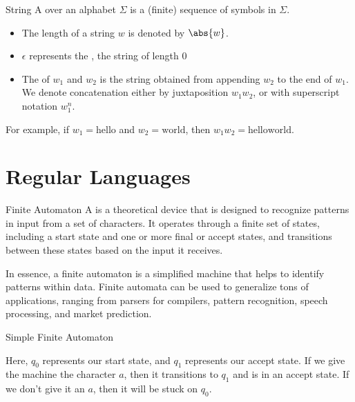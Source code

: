\documentclass[math]{amznotes}
\begin{document}
\begin{dfnbox}{String}{}
    A  over an alphabet $\Sigma$ is a (finite) sequence of symbols in $\Sigma$.
    \begin{itemize}[noitemsep]
        \item The length of a string $w$ is denoted by $\abs{w}$.
        \item $\epsilon$ represents the , the string of length $0$
        \item The  of $w_1$ and $w_2$ is the string obtained from appending $w_2$ to the end of $w_1$. We denote concatenation either by juxtaposition $w_1w_2$, or with superscript notation $w_1^n$.
    \end{itemize}
\end{dfnbox}

For example, if $w_1 = \text{hello}$ and $w_2 = \text{world}$, then $w_1w_2 = \text{helloworld}$.


\chapter{Regular Languages}

\begin{dfnbox}{Finite Automaton}{}
    A  is a theoretical device that is designed to recognize patterns in input from a set of characters. It operates through a finite set of states, including a start state and one or more final or accept states, and transitions between these states based on the input it receives.
\end{dfnbox}

In essence, a finite automaton is a simplified machine that helps to identify patterns within data. Finite automata can be used to generalize tons of applications, ranging from parsers for compilers, pattern recognition, speech processing, and market prediction.

\begin{exbox}{Simple Finite Automaton}{}
    \begin{center}\end{center}
    Here, $q_0$ represents our start state, and $q_1$ represents our accept state. If we give the machine the character $a$, then it transitions to $q_1$ and is in an accept state. If we don't give it an $a$, then it will be stuck on $q_0$.
\end{exbox}
\end{document}
